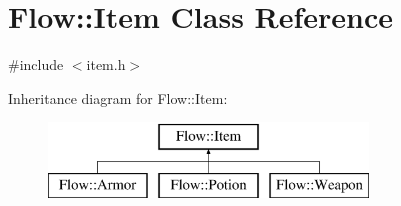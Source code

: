\hypertarget{class_flow_1_1_item}{}\section{Flow\+:\+:Item Class Reference}
\label{class_flow_1_1_item}


{\ttfamily \#include $<$item.\+h$>$}

Inheritance diagram for Flow\+:\+:Item\+:\begin{figure}[H]
\begin{center}
\leavevmode
\includegraphics[height=2.000000cm]{class_flow_1_1_item}
\end{center}
\end{figure}
